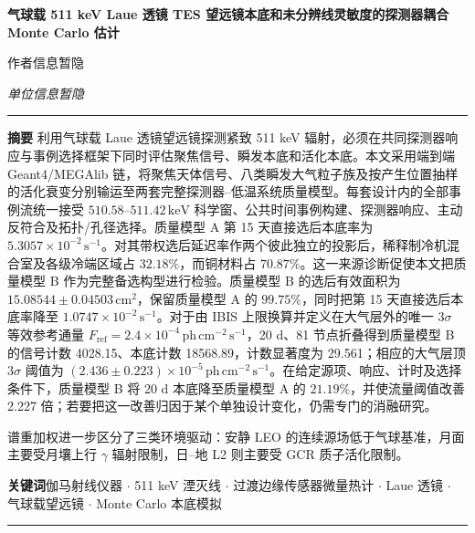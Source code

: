 \documentclass[11pt]{article}
\newcommand{\revblue}[1]{\textcolor{revisionblue}{#1}}
\newcommand{\keV}{\,\mathrm{keV}}
\newcommand{\phcms}{\,\mathrm{ph\,cm^{-2}\,s^{-1}}}
\newcommand{\cps}{\,\mathrm{s^{-1}}}
\newcommand{\fref}{F_{\mathrm{ref}}}
\begin{document}
\thispagestyle{fancy}
\begin{flushleft}
{\LARGE\bfseries 气球载 511 keV Laue 透镜 TES 望远镜本底和未分辨线灵敏度的探测器耦合 Monte Carlo 估计 \par}
\vspace{1.1em}
{\large 作者信息暂隐\par}
\vspace{0.3em}
{\normalsize\itshape 单位信息暂隐\par}
\end{flushleft}
\vspace{0.7em}
\noindent\rule{\textwidth}{0.4pt}
\vspace{0.5em}

\noindent\textbf{摘要}\hspace{0.7em}
利用气球载 Laue 透镜望远镜探测紧致 511 keV 辐射，必须在共同探测器响应与事例选择框架下同时评估聚焦信号、瞬发本底和活化本底。本文采用端到端 Geant4/MEGAlib 链，将聚焦天体信号、\revblue{八类瞬发大气粒子族}及按产生位置抽样的活化衰变分别输运至两套完整探测器--低温系统质量模型。每套设计内的全部事例流统一接受 $510.58$--$511.42\keV$ 科学窗、公共时间事例构建、探测器响应、主动反符合及拓扑/孔径选择。质量模型 A 第 15 天直接选后本底率为 $5.3057\times10^{-2}\cps$。对其带权选后延迟率作两个彼此独立的投影后，稀释制冷机混合室及各级冷端区域占 $32.18\%$，而铜材料占 $70.87\%$。这一来源诊断促使本文把质量模型 B 作为完整备选构型进行检验。质量模型 B 的选后有效面积为 $15.08544\pm0.04503\,\mathrm{cm^2}$，保留质量模型 A 的 $99.75\%$，同时把第 15 天直接选后本底率降至 $1.0747\times10^{-2}\cps$。对于由 IBIS 上限换算并定义在大气层外的唯一 $3\sigma$ 等效参考通量 $\fref=2.4\times10^{-4}\phcms$，20 d、81 节点折叠得到质量模型 B 的信号计数 4028.15、本底计数 18568.89，计数显著度为 29.561；相应的大气层顶 $3\sigma$ 阈值为 $(2.436\pm0.223)\times10^{-5}\phcms$。在给定源项、响应、计时及选择条件下，质量模型 B 将 20 d 本底降至质量模型 A 的 $21.19\%$，并使流量阈值改善 2.227 倍；若要把这一改善归因于某个单独设计变化，仍需专门的消融研究。

谱重加权进一步区分了三类环境驱动：安静 LEO 的连续源场低于气球基准，月面主要受月壤上行 $\gamma$ 辐射限制，日--地 L2 则主要受 GCR 质子活化限制。

\vspace{0.7em}
\noindent\textbf{关键词}\hspace{0.7em}伽马射线仪器 $\cdot$ 511 keV 湮灭线 $\cdot$ 过渡边缘传感器微量热计 $\cdot$ Laue 透镜 $\cdot$ 气球载望远镜 $\cdot$ Monte Carlo 本底模拟

\vspace{0.3em}
\noindent\rule{\textwidth}{0.4pt}
\vspace{1.0em}
\end{document}
